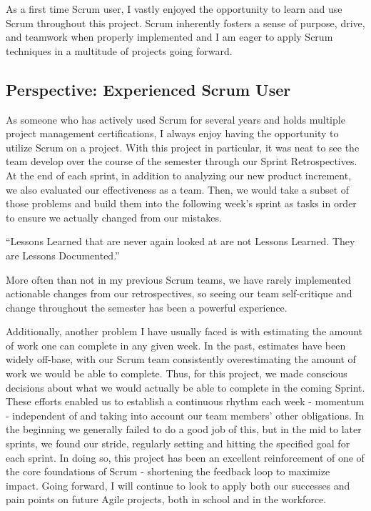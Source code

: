 \documentclass[openright]{report}
\begin{document}
\par As a first time Scrum user, I vastly enjoyed the opportunity to learn and use Scrum throughout this project. Scrum inherently fosters a sense of purpose, drive, and teamwork when properly implemented and I am eager to apply Scrum techniques in a multitude of projects going forward. 

\subsection{Perspective: Experienced Scrum User}

\par As someone who has actively used Scrum for several years and holds multiple project management certifications, I always enjoy having the opportunity to utilize Scrum on a project. With this project in particular, it was neat to see the team develop over the course of the semester through our Sprint Retrospectives. At the end of each sprint, in addition to analyzing our new product increment, we also evaluated our effectiveness as a team. Then, we would take a subset of those problems and build them into the following week's sprint as tasks in order to ensure we actually changed from our mistakes. 
\newline

``Lessons Learned that are never again looked at are not Lessons Learned. They are Lessons Documented.''
\\[5pt]
\newline

\noindent More often than not in my previous Scrum teams, we have rarely implemented actionable changes from our retrospectives, so seeing our team self-critique and change throughout the semester has been a powerful experience. 

\par Additionally, another problem I have usually faced is with estimating the amount of work one can complete in any given week. In the past, estimates have been widely off-base, with our Scrum team consistently overestimating the amount of work we would be able to complete. Thus, for this project, we made conscious decisions about what we would actually be able to complete in the coming Sprint. These efforts enabled us to establish a continuous rhythm each week - momentum - independent of and taking into account our team members' other obligations. In the beginning we generally failed to do a good job of this, but in the mid to later sprints, we found our stride, regularly setting and hitting the specified goal for each sprint. In doing so, this project has been an excellent reinforcement of one of the core foundations of Scrum - shortening the feedback loop to maximize impact. Going forward, I will continue to look to apply both our successes and pain points on future Agile projects, both in school and in the workforce.
\end{document}
